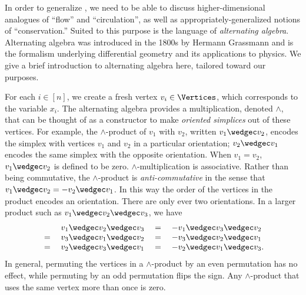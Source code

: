 In order to generalize ,
we need to be able to discuss higher-dimensional analogues of ``flow''
and ``circulation'',
as well as appropriately-generalized notions of ``conservation.''
Suited to this purpose is the language of \emph{alternating algebra}.
Alternating algebra was introduced in the 1800s by Hermann Grassmann
\cite{Grassmann1844,GrassmannKannenberg2000} and is the formalism
underlying differential geometry and its applications to physics.
We give a brief introduction to alternating algebra here,
tailored toward our purposes.

For each \(i\in [n]\), we create a fresh vertex $v_i \in \Vertices$, 
which corresponds to the variable $x_i$.
The alternating algebra provides a multiplication, denoted \(\wedge\),
that can be thought of as a constructor to make \emph{oriented simplices}
out of these vertices.
For example, the \(\wedge\)-product of \(v_1\) with \(v_2\),
written \(v_1\wedgec v_2\), encodes the simplex with vertices
\(v_1\) and \(v_2\) in a particular orientation; \(v_2\wedgec v_1\) encodes the same simplex with the opposite orientation. 
When \(v_1=v_2\), \(v_1\wedgec v_2\) is defined to be zero.
\(\wedge\)-multiplication is associative.
Rather than being commutative,
the \(\wedge\)-product is \emph{anti-commutative} in the sense that
\(v_1\wedgec v_2=-v_2\wedgec v_1\).
In this way the order of the vertices in the product encodes
an orientation.
There are only ever two orientations.
In a larger product such as
\(v_1\wedgec v_2\wedgec v_3\),
we have
\[\begin{array}{crcl}
      &\;   v_1\wedgec v_2\wedgec v_3
  \;&=&\; - v_1\wedgec v_3\wedgec v_2 \\
  \; =&\;   v_3\wedgec v_1\wedgec v_2
  \;&=&\; - v_3\wedgec v_2\wedgec v_1 \\
  \; =&\;   v_2\wedgec v_3\wedgec v_1
  \;&=&\; - v_2\wedgec v_1\wedgec v_3.
\end{array}\]
In general, permuting the vertices in a \(\wedge\)-product by an
even permutation has no effect,
while permuting by an odd permutation flips the sign.
Any \(\wedge\)-product that uses the same vertex more than once is
zero.

